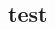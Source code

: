 




	\title{\FormelsammlungTitel}
	\author{\FormelsammlungAutor}
	\date{\today}
	\begin{multicols}{3}
		\begin{minipage}{.32\paperheight}
			\maketitle
			\tableofcontents
		\end{minipage}
		\section{test}
	\end{multicols}

